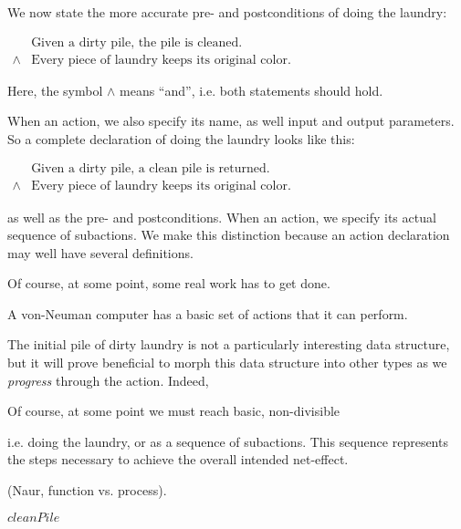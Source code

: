 We now state the more accurate pre- and postconditions of doing the laundry:

\begin{codebox}
\zi
$\begin{array}{ll}
&\text{Given a dirty pile, the pile is cleaned.}\\
\wedge&\text{Every piece of laundry keeps its original color.}
\end{array}$
\end{codebox}

Here, the symbol $\wedge$ means ``and'', i.e. both statements should hold.

When  an action, we also specify its name, as well input and
output parameters. So a complete declaration of doing the laundry looks like
this:

\begin{codebox}
\zi
$\begin{array}{ll}
&\text{Given a dirty pile, a clean pile is returned.}\\
\wedge&\text{Every piece of laundry keeps its original color.}
\end{array}$
\end{codebox}



as well as the pre- and postconditions. When 
an action, we specify its actual sequence of subactions. We make this
distinction because an action declaration may well have several definitions.

Of course, at some point, some real work has to get done.

A von-Neuman computer has a basic set of actions that it can perform.


The initial pile of dirty laundry is not a particularly interesting data
structure, but it will prove beneficial to morph this data structure into other
types as we \emph{progress} through the action. Indeed, 

Of course, at some point we must reach basic, non-divisible 


 i.e.  doing
the laundry, or as a sequence of subactions. This sequence represents the steps
necessary to achieve the overall intended net-effect.


(Naur,
function vs. process).

\begin{codebox}
\li \Return $cleanPile$
\end{codebox}

